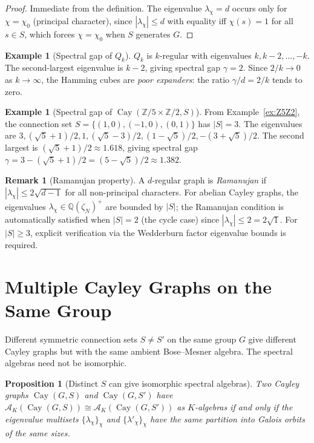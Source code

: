 \documentclass[12pt]{amsart}
\numberwithin{equation}{section}
\theoremstyle{plain}
\newtheorem{proposition}[theorem]{Proposition}
\theoremstyle{definition}
\newtheorem{example}[theorem]{Example}
\newtheorem{remark}[theorem]{Remark}
\DeclareMathOperator{\Cay}{Cay}
\newcommand{\Z}{\mathbb{Z}}
\newcommand{\Q}{\mathbb{Q}}
\newcommand{\calA}{\mathcal{A}}
\begin{document}
\begin{proof}
Immediate from the definition.  The eigenvalue $\lambda_\chi = d$ occurs
only for $\chi = \chi_0$ (principal character), since $|\lambda_\chi| \le d$
with equality iff $\chi(s) = 1$ for all $s \in S$, which forces
$\chi = \chi_0$ when $S$ generates $G$.
\end{proof}

\begin{example}[Spectral gap of $Q_k$]
$Q_k$ is $k$-regular with eigenvalues $k, k-2, \ldots, -k$.  The
second-largest eigenvalue is $k-2$, giving spectral gap $\gamma = 2$.
Since $2/k \to 0$ as $k \to \infty$, the Hamming cubes are
\emph{poor expanders}: the ratio $\gamma/d = 2/k$ tends to zero.
\end{example}

\begin{example}[Spectral gap of $\Cay(\Z/5 \times \Z/2, S)$]
From Example~\ref{ex:Z5Z2}, the connection set $S = \{(1,0),(-1,0),(0,1)\}$
has $|S| = 3$.  The eigenvalues are $3, (\sqrt{5}+1)/2, 1, (\sqrt{5}-3)/2,
(1-\sqrt{5})/2, -(3+\sqrt{5})/2$.  The second largest is
$(\sqrt{5}+1)/2 \approx 1.618$, giving spectral gap
$\gamma = 3 - (\sqrt{5}+1)/2 = (5-\sqrt{5})/2 \approx 1.382$.
\end{example}

\begin{remark}[Ramanujan property]
A $d$-regular graph is \emph{Ramanujan} if $|\lambda_\chi| \le 2\sqrt{d-1}$
for all non-principal characters.  For abelian Cayley graphs, the
eigenvalues $\lambda_\chi \in \Q(\zeta_N)^+$ are bounded by $|S|$;
the Ramanujan condition is automatically satisfied when $|S| = 2$
(the cycle case) since $|\lambda_\chi| \le 2 = 2\sqrt{1}$.  For $|S| \ge 3$,
explicit verification via the Wedderburn factor eigenvalue bounds is required.
\end{remark}

\section{Multiple Cayley Graphs on the Same Group}
\label{sec:multiple}

Different symmetric connection sets $S \ne S'$ on the same group $G$
give different Cayley graphs but with the same ambient Bose--Mesner algebra.
The spectral algebras need not be isomorphic.

\begin{proposition}[Distinct $S$ can give isomorphic spectral algebras]
\label{prop:same-type}
Two Cayley graphs $\Cay(G,S)$ and $\Cay(G,S')$ have
$\calA_K(\Cay(G,S)) \cong \calA_K(\Cay(G,S'))$ as $K$-algebras if and
only if the eigenvalue multisets $\{\lambda_\chi\}_\chi$ and
$\{\lambda'_\chi\}_\chi$ have the same partition into Galois orbits of
the same sizes.
\end{proposition}
\end{document}
